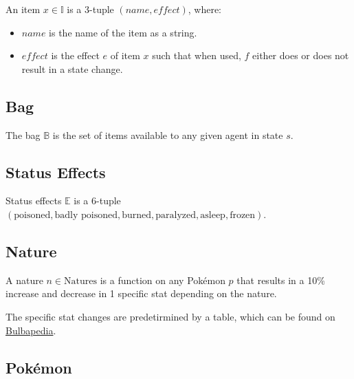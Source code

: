 An item $x \in \mathbb{I}$ is a 3-tuple $(name, effect)$, where:
\begin{itemize}
    \item $name$ is the name of the item as a string.
    \item $effect$ is the effect $e$ of item $x$ such that when used, $f$ either does or does not result in a state change.
\end{itemize}

\subsection{Bag}

The bag $\mathbb{B}$ is the set of items available to any given agent in state $s$.

\subsection{Status Effects}

Status effects $\mathbb{E}$ is a 6-tuple $( \text{poisoned}, \text{badly poisoned}, \text{burned}, \text{paralyzed}, \text{asleep}, \text{frozen} )$.

\subsection{Nature}

A nature $n \in \text{Natures}$ is a function on any Pokémon $p$ that results in a 10\% increase and decrease in 1 specific stat depending on the nature.

The specific stat changes are predetirmined by a table, which can be found on \href{https://bulbapedia.bulbagarden.net/wiki/Nature#Stat-focused_table}{Bulbapedia}.

\subsection{Pokémon}

